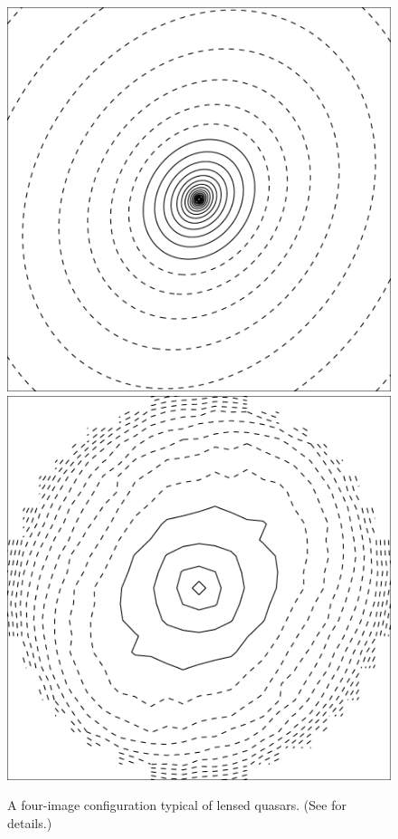 \begin{figure}
  \includegraphics[width=\myplotswidth]{fig/ASW0001hpf_006915_kappa}
  \includegraphics[width=\myplotswidth]{fig/006915_mass}

  \caption[result 6915 (ASW0001hpf)]{A four-image configuration
    typical of lensed quasars. (See  for
    details.)}
  \label{fig:6915}
\end{figure}


